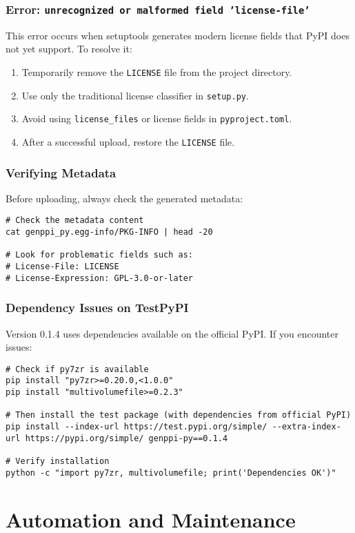 \documentclass[11pt, a4paper]{article}
\begin{document}
\subsubsection{Error: \texttt{unrecognized or malformed field 'license-file'}}
This error occurs when setuptools generates modern license fields that PyPI does not yet support. To resolve it:
\begin{enumerate}
    \item Temporarily remove the \texttt{LICENSE} file from the project directory.
    \item Use only the traditional license classifier in \texttt{setup.py}.
    \item Avoid using \texttt{license\_files} or license fields in \texttt{pyproject.toml}.
    \item After a successful upload, restore the \texttt{LICENSE} file.
\end{enumerate}

\subsubsection{Verifying Metadata}
Before uploading, always check the generated metadata:
\begin{lstlisting}[style=bashstyle]
# Check the metadata content
cat genppi_py.egg-info/PKG-INFO | head -20

# Look for problematic fields such as:
# License-File: LICENSE
# License-Expression: GPL-3.0-or-later
\end{lstlisting}

\subsubsection{Dependency Issues on TestPyPI}
Version 0.1.4 uses dependencies available on the official PyPI. If you encounter issues:
\begin{lstlisting}[style=bashstyle]
# Check if py7zr is available
pip install "py7zr>=0.20.0,<1.0.0"
pip install "multivolumefile>=0.2.3"

# Then install the test package (with dependencies from official PyPI)
pip install --index-url https://test.pypi.org/simple/ --extra-index-url https://pypi.org/simple/ genppi-py==0.1.4

# Verify installation
python -c "import py7zr, multivolumefile; print('Dependencies OK')"
\end{lstlisting}

\section{Automation and Maintenance}
\end{document}
